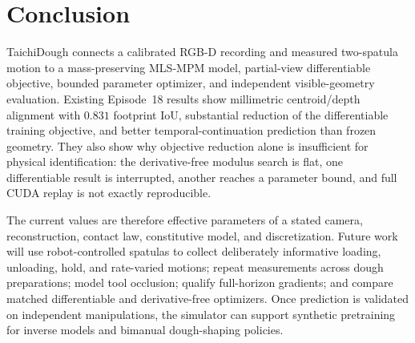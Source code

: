 \section{Conclusion}
\label{sec:conclusion}

TaichiDough connects a calibrated RGB-D recording and measured two-spatula motion to a mass-preserving MLS-MPM model, partial-view differentiable objective, bounded parameter optimizer, and independent visible-geometry evaluation. Existing Episode~18 results show millimetric centroid/depth alignment with $0.831$ footprint IoU, substantial reduction of the differentiable training objective, and better temporal-continuation prediction than frozen geometry. They also show why objective reduction alone is insufficient for physical identification: the derivative-free modulus search is flat, one differentiable result is interrupted, another reaches a parameter bound, and full CUDA replay is not exactly reproducible.

The current values are therefore effective parameters of a stated camera, reconstruction, contact law, constitutive model, and discretization. Future work will use robot-controlled spatulas to collect deliberately informative loading, unloading, hold, and rate-varied motions; repeat measurements across dough preparations; model tool occlusion; qualify full-horizon gradients; and compare matched differentiable and derivative-free optimizers. Once prediction is validated on independent manipulations, the simulator can support synthetic pretraining for inverse models and bimanual dough-shaping policies.

